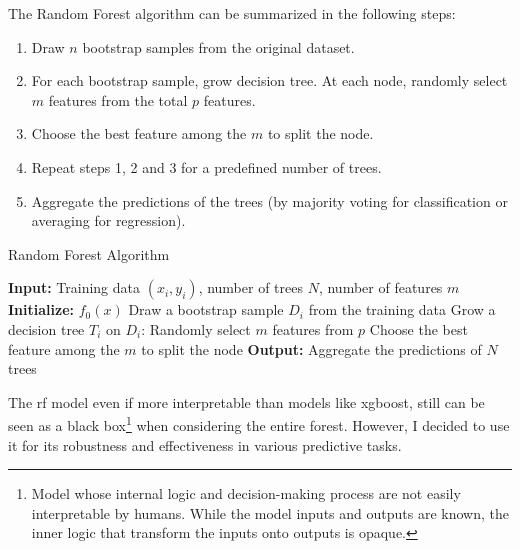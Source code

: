 \documentclass[12pt]{article}
\begin{document}
The Random Forest algorithm can be summarized in the following steps:
 
\begin{enumerate}
    \item Draw $n$ bootstrap samples from the original dataset.
    \item For each bootstrap sample, grow decision tree. At each node, randomly select $m$ features from the total $p$ features. \item Choose the best feature among the $m$ to split the node.
    \item Repeat steps 1, 2 and 3 for a predefined number of trees.
    \item Aggregate the predictions of the trees (by majority voting for classification or averaging for regression).
\end{enumerate}



\begin{algorithm}[H]
\caption{Random Forest Algorithm}
\begin{algorithmic}
\STATE \textbf{Input:} Training data $(x_i, y_i)$, number of trees $N$, number of features $m$
\STATE \textbf{Initialize:} $f_0(x)$
    \STATE Draw a bootstrap sample $D_i$ from the training data
    \STATE Grow a decision tree $T_i$ on $D_i$:
        \STATE Randomly select $m$ features from $p$
        \STATE Choose the best feature among the $m$ to split the node
    \ENDFOR
\ENDFOR
\STATE \textbf{Output:} Aggregate the predictions of $N$ trees
\end{algorithmic}
\end{algorithm}
 
 
 

 

The \acrshort{rf} model even if more interpretable than models like \acrshort{xgboost}, still can be seen as a black box\footnote{Model whose internal logic and decision-making process are not easily interpretable by humans. While the model inputs and outputs are known, the inner logic that transform the inputs onto outputs is opaque.} when considering the entire forest. However, I decided to use it for its robustness and effectiveness in various predictive tasks.
\end{document}
